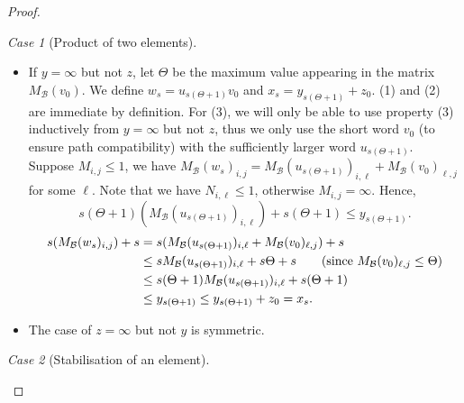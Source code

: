 \documentclass[10pt,a4paper]{amsart}
\theoremstyle{definition}
\numberwithin{equation}{section}
\theoremstyle{remark}
\newtheorem{case}{Case}
\newcommand{\autB}{\mathcal{B}}
\theoremstyle{remark}
\begin{document}
\begin{proof}
\begin{case}[Product of two elements]
\begin{itemize}
\item If $y=\infty$ but not $z$, let $\Theta$ be the maximum value appearing in the matrix $M_\autB(v_0)$. We define $w_s = u_{s(\Theta+1)}v_0$ and $x_s = y_{s(\Theta+1)}+z_0$. (1) and (2) are immediate by definition. For (3), we will only be able to use property (3) inductively from $y=\infty$ but not $z$, thus we only use the short word $v_0$ (to ensure path compatibility) with the sufficiently larger word $u_{s(\Theta+1)}$. Suppose $M_{i,j} \le 1$, we have $M_\autB(w_s)_{i,j} = M_\autB(u_{s(\Theta+1)})_{i,\ell} + M_\autB(v_0)_{\ell,j}$ for some $\ell$.
Note that we have $N_{i,\ell} \le 1$, otherwise $M_{i,j} = \infty$. Hence, 
$$s(\Theta+1)(M_\autB(u_{s(\Theta+1)})_{i,\ell})+ {s(\Theta+1)} \le y_{s(\Theta+1)}.$$ 
\begin{align*}
s(M_\autB(w_s)_{i,j}) + s & = s(M_\autB(u_{s(\Theta+1)})_{i,\ell} + M_\autB(v_0)_{\ell,j} ) + s
\\ &\le sM_\autB(u_{s(\Theta+1)})_{i,\ell} + s\Theta +s  \tag{since $M_\autB(v_0)_{\ell,j} \le \Theta$}
\\ &\le s(\Theta+1)M_\autB(u_{s(\Theta+1)})_{i,\ell} +s(\Theta+1)
\\ &\le y_{s(\Theta+1)} \le y_{s(\Theta+1)} + z_0 = x_s.
\end{align*}

\item The case of $z=\infty$ but not $y$ is symmetric.
\end{itemize}

\end{case}
\begin{case}[Stabilisation of an element]


\end{case}
\end{proof}
\end{document}
